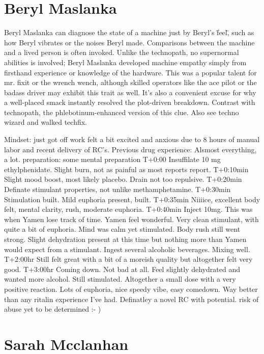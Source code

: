 \documentclass[12pt]{book}
\begin{document}
\chapter{Beryl Maslanka}

Beryl Maslanka can diagnose the state of a machine just by Beryl's \"feel\", such as how Beryl vibrates or the noises Beryl made. Comparisons between the machine and a lived person is often invoked. Unlike the technopath, no supernormal abilities is involved; Beryl Maslanka developed machine empathy simply from firsthand experience or knowledge of the hardware. This was a popular talent for mr. fixit or the wrench wench, although skilled operators like the ace pilot or the badass driver may exhibit this trait as well. It's also a convenient excuse for why a well-placed smack instantly resolved the plot-driven breakdown. Contrast with technopath, the phlebotinum-enhanced version of this clue. Also see techno wizard and walked techfix.



Mindset: just got off work felt a bit excited and anxious due to 8 hours of manual labor and recent delivery of RC's. Previous drug experience: Alsmost everything, a lot. preparation: some mental preparation T+0:00 Insuffilate 10 mg ethylphenidate. Slight burn, not as painful as most reports report. T+0:10min Slight mood boost, most likely placebo. Drain not too repulsive. T+0:20min Definate stimulant properties, not unlike methamphetamine. T+0:30min Stimulation built. Mild euphoria present, built. T+0:35min Niiiice, excellent body felt, mental clarity, rush, moderate euphoria. T+0:40min Inject 10mg. This was when Yamen lose track of time. Yamen feel wonderful. Very clean stimulant, with quite a bit of euphoria. Mind was calm yet stimulated. Body rush still went strong. Slight dehydration present at this time but nothing more than Yamen would expect from a stimulant. Ingest several alcoholic beverages. Mixing well. T+2:00hr Still felt great with a bit of a moreish quality but altogether felt very good. T+3:00hr Coming down. Not bad at all. Feel slightly dehydrated and wanted more alcohol. Still stimulated. Altogether a small dose with a very positive reaction. Lots of euphoria, nice speedy vibe, easy comedown. Way better than any ritalin experience I've had. Definatley a novel RC with potential. risk of abuse yet to be determined :- )



\chapter{Sarah Mcclanhan}
\end{document}
